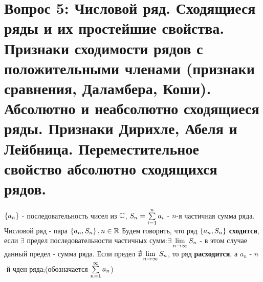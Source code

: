 \section{Вопрос 5: Числовой ряд. Сходящиеся ряды и их простейшие свойства. Признаки сходимости рядов с положительными членами (признаки сравнения, Даламбера, Коши). Абсолютно и неабсолютно сходящиеся ряды. Признаки
Дирихле, Абеля и Лейбница. Переместительное свойство абсолютно сходящихся рядов.}

\begin{defs}
	$\left\{ a_n\right\}$ - последовательность чисел из $\mathbb{C}$, $S_n = \sum\limits_{i=1}^{n}a_i$ - $n$-я частичная сумма ряда. Числовой ряд - пара $\left\{ a_n, S_n\right\}, n \in \mathbb{R}$ Будем говорить, что ряд $\left\{ a_n, S_n\right\}$ \textbf{сходится}, если $\exists$ предел последовательности частичных сумм:$\exists \lim\limits_{n\to \infty}S_n$ - в этом случае данный предел - сумма ряда. Если предел $\nexists \lim\limits_{n\to \infty}S_n$, то ряд \textbf{расходится}, а $a_n$ - $n$-й  чден ряда;(обозначается $\sum\limits_{n=1}^{\infty}a_n$)
\end{defs}

